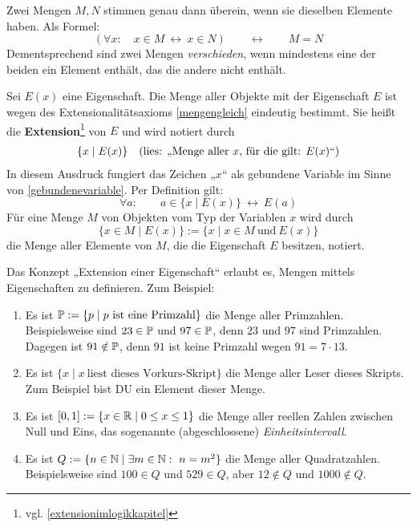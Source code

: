\begin{axiom} \label{mengengleich} 
    Zwei Mengen $M,N$ stimmen genau dann überein, wenn sie dieselben Elemente haben. Als Formel:
        \[ (\forall x:\quad x\in M\ \leftrightarrow\ x\in N)\qquad\leftrightarrow\qquad M=N\]
    Dementsprechend sind zwei Mengen \emph{verschieden}, wenn mindestens eine der beiden ein Element enthält, das die andere nicht enthält.
\end{axiom}


\begin{defin} \label{def:extension} 
    Sei $E(x)$ eine Eigenschaft. Die Menge aller Objekte mit der Eigenschaft $E$ ist wegen des Extensionalitätsaxioms \cref{mengengleich} eindeutig bestimmt. Sie heißt die \textbf{Extension}\footnote{vgl. \cref{extensionimlogikkapitel}} von $E$ und wird notiert durch
    \begin{align*}
        \{ x\mid E(x) \} && (\textnormal{lies: „Menge aller $x$, für die gilt: $E(x)$“})
    \end{align*}
    In diesem Ausdruck fungiert das Zeichen „$x$“ als gebundene Variable im Sinne von \cref{gebundenevariable}. Per Definition gilt:
        \[ \forall a:\qquad a\in \{x\mid E(x)\} \ \leftrightarrow\ E(a) \]
    Für eine Menge $M$ von Objekten vom Typ der Variablen $x$ wird durch
        \[ \{ x\in M\mid E(x) \} := \{ x\mid x\in M\ \text{und}\ E(x)\} \]
    die Menge aller Elemente von $M$, die die Eigenschaft $E$ besitzen, notiert.
\end{defin}


\begin{bsp} \label{bsp:extension}
    Das Konzept „Extension einer Eigenschaft“ erlaubt es, Mengen mittels Eigenschaften zu definieren. Zum Beispiel:
    \begin{enumerate}
        \item Es ist $\mathbb P := \{p\mid p\ \text{ist eine Primzahl}\}$ die Menge aller Primzahlen. Beispielsweise sind $23\in \mathbb P$ und $97\in\mathbb P$, denn $23$ und $97$ sind Primzahlen. Dagegen ist $91\notin \mathbb P$, denn $91$ ist keine Primzahl wegen $91=7\cdot 13$.
        \item Es ist $\{ x\mid x\ \text{liest dieses Vorkurs-Skript} \}$ die Menge aller Leser dieses Skripts. Zum Beispiel bist DU ein Element dieser Menge.
        \item Es ist $[0,1] := \{ x\in \mathbb R \mid 0\le x\le 1\}$ die Menge aller reellen Zahlen zwischen Null und Eins, das sogenannte (abgeschlossene) \emph{Einheitsintervall}.
        \item Es ist $Q:=\{ n\in \mathbb N \mid \exists m\in \mathbb N:\ n=m^2 \}$ die Menge aller Quadratzahlen. Beispielsweise sind $100\in Q$ und $529\in Q$, aber $12\notin Q$ und $1000\notin Q$.
    \end{enumerate}
\end{bsp}


